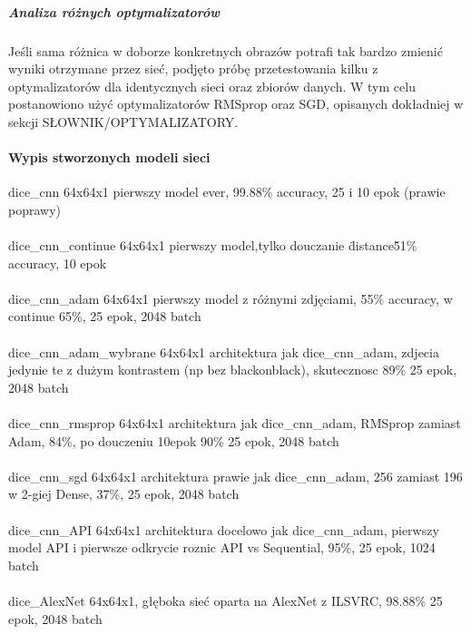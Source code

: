 \subparagraph{Analiza różnych optymalizatorów}
Jeśli sama różnica w doborze konkretnych obrazów potrafi tak bardzo zmienić wyniki
otrzymane przez sieć, podjęto próbę przetestowania kilku z optymalizatorów dla
identycznych sieci oraz zbiorów danych. W tym celu postanowiono użyć optymalizatorów
RMSprop oraz SGD, opisanych dokładniej w sekcji SŁOWNIK/OPTYMALIZATORY.


\paragraph{Wypis stworzonych modeli sieci}

dice_cnn 64x64x1 pierwszy model ever, 99.88\% accuracy, 25 i 10 epok (prawie poprawy) \\\\

dice_cnn_continue 64x64x1 pierwszy model,tylko douczanie \"distance\" 51\% accuracy, 10 epok \\\\

dice_cnn_adam 64x64x1 pierwszy model z różnymi zdjęciami, 55\% accuracy, w continue 65\%, 25 epok, 2048 batch\\\\

dice_cnn_adam_wybrane 64x64x1 architektura jak dice_cnn_adam, zdjecia jedynie te z dużym
kontrastem (np bez blackonblack), skutecznosc 89\% 25 epok, 2048 batch \\\\

dice_cnn_rmsprop 64x64x1 architektura jak dice_cnn_adam, RMSprop zamiast Adam, 84\%, po
douczeniu 10epok 90\% 25 epok, 2048 batch \\\\

dice_cnn_sgd 64x64x1 architektura prawie jak dice_cnn_adam, 256 zamiast 196 w 2-giej Dense,
37\%, 25 epok, 2048 batch \\\\

dice_cnn_API 64x64x1 architektura docelowo jak dice_cnn_adam, pierwszy model API i pierwsze
odkrycie roznic API vs Sequential, 95\%, 25 epok, 1024 batch \\\\

dice_AlexNet 64x64x1, głęboka sieć oparta na AlexNet z ILSVRC,  98.88\% 25 epok, 2048 batch \\\\

